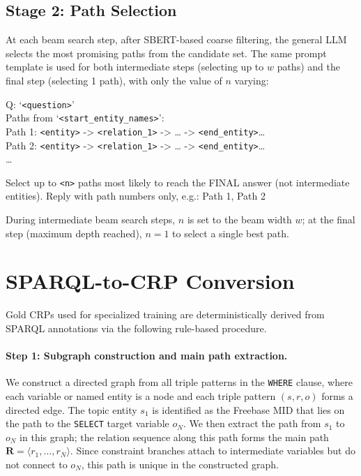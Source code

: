 \documentclass[11pt]{article}
\begin{document}
\subsection{Stage 2: Path Selection}
\label{app:prompt_path_selection}

At each beam search step, after SBERT-based coarse filtering, the general LLM selects the most promising paths from the candidate set. The same prompt template is used for both intermediate steps (selecting up to $w$ paths) and the final step (selecting 1 path), with only the value of $n$ varying:

\begin{tcolorbox}[colback=gray!5, colframe=gray!60, title=Path Selection Prompt, breakable]
\small
Q: `\texttt{<question>}'\\
Paths from `\texttt{<start\_entity\_names>}':\\
Path 1: \texttt{<entity>} -> \texttt{<relation\_1>} -> \ldots{} -> \texttt{<end\_entity>}\ldots\\
Path 2: \texttt{<entity>} -> \texttt{<relation\_1>} -> \ldots{} -> \texttt{<end\_entity>}\ldots\\
\ldots

Select up to \texttt{<n>} paths most likely to reach the FINAL answer (not intermediate entities). Reply with path numbers only, e.g.: Path 1, Path 2
\end{tcolorbox}

\noindent During intermediate beam search steps, $n$ is set to the beam width $w$; at the final step (maximum depth reached), $n{=}1$ to select a single best path.

\section{SPARQL-to-CRP Conversion}
\label{app:mrp_conversion}

Gold CRPs used for specialized training are deterministically derived from
SPARQL annotations via the following rule-based procedure.

\paragraph{Step 1: Subgraph construction and main path extraction.}
We construct a directed graph from all triple patterns in the
\texttt{WHERE} clause, where each variable or named entity is a node and
each triple pattern $(s, r, o)$ forms a directed edge.
The topic entity $s_1$ is identified as the Freebase MID that lies on the
path to the \texttt{SELECT} target variable $o_N$.
We then extract the path from $s_1$ to $o_N$ in this graph;
the relation sequence along this path forms the main path
$\mathbf{R}=\langle r_1, \ldots, r_N \rangle$.
Since constraint branches attach to intermediate variables but do not
connect to $o_N$, this path is unique in the constructed graph.
\end{document}
